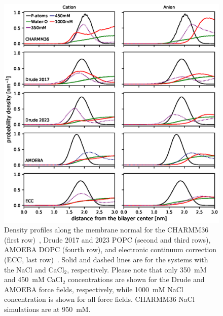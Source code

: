 \documentclass[journal=jacsat,manuscript=article,layout=singlecolumn]{achemso}
\begin{document}
\begin{figure}[!hbt]
    \centering
    \includegraphics{Figures/ion_density_profiles_with_chloride.eps}
    \caption{Density profiles along the membrane normal for the CHARMM36 (first row)~\cite{Catte2016}, Drude 2017 and 2023 POPC (second and third rows), AMOEBA DOPC (fourth row), and electronic continuum correction (ECC, last row)~\cite{Melcr:2018a}. Solid and dashed lines are for the systems with the NaCl and CaCl$_{2}$, respectively. Please note that only 350~mM and 450~mM CaCl$_{2}$ concentrations are shown for the Drude and AMOEBA force fields, respectively, while 1000~mM NaCl concentration is shown for all force fields. CHARMM36 NaCl simulations are at 950~mM.}
    \label{fig:ion_density_profiles}
\end{figure}


\clearpage
\end{document}
